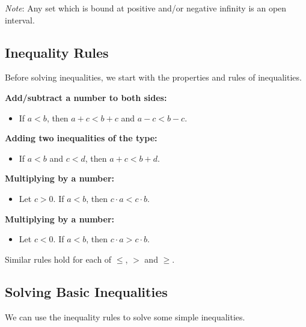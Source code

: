 \textit{Note}: Any set which is bound at positive and/or negative infinity is an open interval.

\subsection*{Inequality Rules}
Before solving inequalities, we start with the properties and rules of inequalities.\\

\begin{formulabox}
{\bf Add/subtract a number to both sides:}\vspace{-0.2cm}
\begin{itemize}
	\item If $a<b$, then $a+c<b+c$ and $a-c<b-c$.
\end{itemize}
{\bf Adding two inequalities of the  type:}\vspace{-0.2cm}
\begin{itemize}
	\item If $a<b$ and $c<d$, then $a+c<b+d$.\\
\end{itemize}
{\bf Multiplying by a  number:}\vspace{-0.2cm}
\begin{itemize}
	\item Let $c>0$. If $a<b$, then $c\cdot a<c\cdot b$.
\end{itemize}
{\bf Multiplying by a   number:}\vspace{-0.2cm}
\begin{itemize}
	\item Let $c<0$. If $a<b$, then $c\cdot a>c\cdot b$.\\
\end{itemize}
\end{formulabox}

Similar rules hold for each of $\leq$, $>$ and $\geq$.


\subsection*{Solving Basic Inequalities}
We can use the inequality rules to solve some simple inequalities. \\

